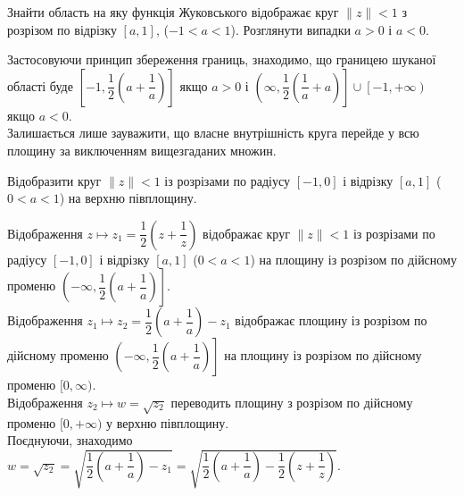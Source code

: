 \begin{problem}[Волковиський, 2.112]
    Знайти область на яку функція Жуковського відображає круг $\|z\| < 1$ з розрізом по відрізку $[a, 1]$, ($-1 < a < 1$). Розглянути випадки $a > 0$ і $a < 0$.
\end{problem}

\begin{solution}
    Застосовуючи принцип збереження границь, знаходимо, що границею шуканої області буде $\left[-1, \dfrac12 \left(a + \dfrac1a\right)\right]$ якщо $a > 0$ і $\left(\infty, \dfrac12\left(\dfrac1a + a\right)\right] \cup \left[-1, +\infty\right)$ якщо $a < 0$. \\
    
    Залишається лише зауважити, що власне внутрішність круга перейде у всю площину за виключенням вищезгаданих множин.
\end{solution}

\begin{problem}[Волковиський, 2.114]
    Відобразити круг $\|z\| < 1$ із розрізами по радіусу $[-1, 0]$ і відрізку $[a, 1]$ ($0 < a < 1$) на верхню півплощину.
\end{problem}

\begin{solution}
    Відображення $z \mapsto z_1 = \dfrac12 \left(z + \dfrac1z\right)$ відображає круг $\|z\| < 1$ із розрізами по радіусу $[-1, 0]$ і відрізку $[a, 1]$ ($0 < a < 1$) на площину із розрізом по дійсному променю $\left(-\infty, \dfrac12\left(a + \dfrac1a\right)\right]$. \\
    
    Відображення $z_1 \mapsto z_2 = \dfrac12\left(a + \dfrac1a\right) - z_1$ відображає площину із розрізом по дійсному променю $\left(-\infty, \dfrac12\left(a + \dfrac1a\right)\right]$ на площину із розрізом по дійсному променю $[0, \infty)$. \\
    
    Відображення $z_2 \mapsto w = \sqrt{z_2}$ переводить площину з розрізом по дійсному променю $[0,+\infty)$ у верхню півплощину. \\
    
    Поєднуючи, знаходимо $w = \sqrt{z_2} = \sqrt{\dfrac12\left(a + \dfrac1a\right) - z_1} = \sqrt{\dfrac12\left(a + \dfrac1a\right) - \dfrac12 \left(z + \dfrac1z\right)}$.
\end{solution}